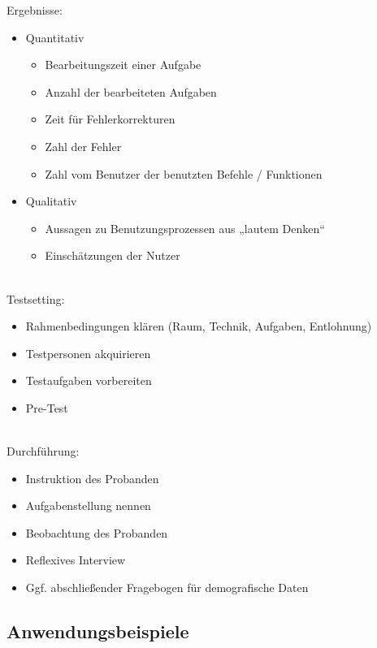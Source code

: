 \documentclass[a4paper]{article}
\begin{document}
Ergebnisse:
\begin{itemize}
	\item Quantitativ
	\begin{itemize}
		\item Bearbeitungszeit einer Aufgabe
		\item Anzahl der bearbeiteten Aufgaben
		\item Zeit für Fehlerkorrekturen
		\item Zahl der Fehler
		\item Zahl vom Benutzer der benutzten Befehle / Funktionen
	\end{itemize}
	\item Qualitativ
	\begin{itemize}
		\item Aussagen zu Benutzungsprozessen aus „lautem Denken“
		\item Einschätzungen der Nutzer
	\end{itemize}
\end{itemize}
~\\
Testsetting:
\begin{itemize}
	\item Rahmenbedingungen klären (Raum, Technik, Aufgaben, Entlohnung)
	\item Testpersonen akquirieren
	\item Testaufgaben vorbereiten
	\item Pre-Test
\end{itemize}
~\\
Durchführung:
\begin{itemize}
	\item Instruktion des Probanden
	\item Aufgabenstellung nennen
	\item Beobachtung des Probanden
	\item Reflexives Interview
	\item Ggf. abschließender Fragebogen für demografische Daten
\end{itemize}

\subsection{Anwendungsbeispiele}
\end{document}
